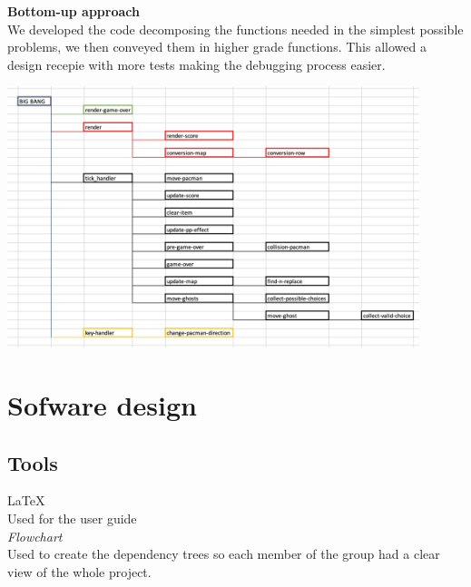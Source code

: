 \documentclass{article}
\begin{document}
 \textbf{Bottom-up approach}\\
 We developed the code decomposing the functions needed in the simplest possible problems, we then conveyed them in higher grade functions. This allowed a design recepie with more tests making the debugging process easier.
 
  \begin{center}
 \includegraphics[width=12cm]{images/dependency_tree2.jpeg}
 \end{center}
 
 \section{Sofware design}
 \subsection{Tools}
 \hspace{0.5cm}\LaTeX \\
 Used for the user guide\\
 
 \textit{Flowchart}\\
 Used to create the dependency trees so each member of the group had a clear view of the whole project.
 
\end{document}
